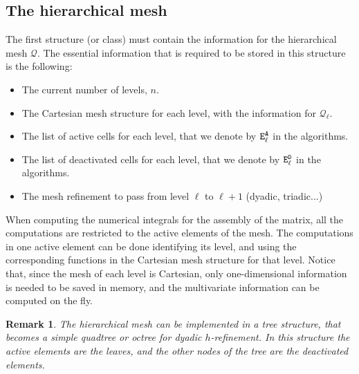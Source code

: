 \documentclass[a4paper]{siamltex1213}
\newtheorem{remark}[theorem]{Remark}
\newcommand{\activeelements}[1]{\tt E^A_{#1}}
\newcommand{\deactelements}[1]{\tt E^D_{#1}}
\newcommand\QQ{\mathcal Q}
\begin{document}
\subsection{The hierarchical mesh}
The first structure (or class) must contain the information for the hierarchical mesh $\QQ$. The essential information that is required to be stored in this structure is the following:
\begin{itemize}
\item The current number of levels, $n$.
\item The Cartesian mesh structure for each level, with the information for $\QQ_\ell$.
\item The list of active cells for each level, that we denote by $\activeelements{\ell}$ in the algorithms.
\item The list of deactivated cells for each level, that we denote by $\deactelements{\ell}$ in the algorithms.
\item The mesh refinement to pass from level $\ell$ to $\ell+1$ (dyadic, triadic...)
\end{itemize}
When computing the numerical integrals for the assembly of the matrix, all the computations are restricted to the active elements of the mesh. The computations in one active element can be done identifying its level, and using the corresponding functions in the Cartesian mesh structure for that level. Notice that, since the mesh of each level is Cartesian, only one-dimensional information is needed to be saved in memory, and the multivariate information can be computed on the fly.

\begin{remark}
The hierarchical mesh can be implemented in a tree structure, that becomes a simple quadtree or octree for dyadic $h$-refinement. In this structure the active elements are the leaves, and the other nodes of the tree are the deactivated elements.
\end{remark}
\end{document}
